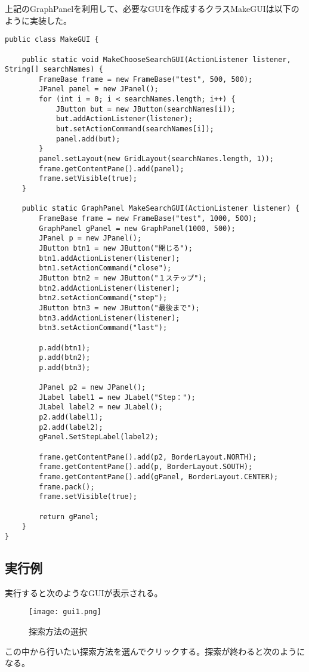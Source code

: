 \documentclass{jarticle}
\begin{document}
上記のGraphPanelを利用して、必要なGUIを作成するクラスMakeGUIは以下のように実装した。
\begin{lstlisting}[caption=MakeGUI,label=src:MakeGUI3]
public class MakeGUI {

	public static void MakeChooseSearchGUI(ActionListener listener, String[] searchNames) {
		FrameBase frame = new FrameBase("test", 500, 500);
		JPanel panel = new JPanel();
		for (int i = 0; i < searchNames.length; i++) {
			JButton but = new JButton(searchNames[i]);
			but.addActionListener(listener);
			but.setActionCommand(searchNames[i]);
			panel.add(but);
		}
		panel.setLayout(new GridLayout(searchNames.length, 1));
		frame.getContentPane().add(panel);
		frame.setVisible(true);
	}

	public static GraphPanel MakeSearchGUI(ActionListener listener) {
		FrameBase frame = new FrameBase("test", 1000, 500);
		GraphPanel gPanel = new GraphPanel(1000, 500);
		JPanel p = new JPanel();
		JButton btn1 = new JButton("閉じる");
		btn1.addActionListener(listener);
		btn1.setActionCommand("close");
		JButton btn2 = new JButton("１ステップ");
		btn2.addActionListener(listener);
		btn2.setActionCommand("step");
		JButton btn3 = new JButton("最後まで");
		btn3.addActionListener(listener);
		btn3.setActionCommand("last");

		p.add(btn1);
		p.add(btn2);
		p.add(btn3);

		JPanel p2 = new JPanel();
		JLabel label1 = new JLabel("Step：");
		JLabel label2 = new JLabel();
		p2.add(label1);
		p2.add(label2);
		gPanel.SetStepLabel(label2);

		frame.getContentPane().add(p2, BorderLayout.NORTH);
		frame.getContentPane().add(p, BorderLayout.SOUTH);
		frame.getContentPane().add(gPanel, BorderLayout.CENTER);
		frame.pack();
		frame.setVisible(true);

		return gPanel;
	}
}
\end{lstlisting}

\subsection{実行例}
実行すると次のようなGUIが表示される。


\begin{figure}[!hbt]
  \centering
  \texttt{[image: gui1.png]}
  \caption{探索方法の選択}
  \label{fig:gui1}
\end{figure}

この中から行いたい探索方法を選んでクリックする。探索が終わると次のようになる。
\end{document}
